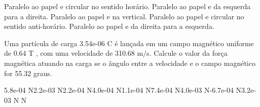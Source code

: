 \documentclass[12pt, addpoints]{exam}
\begin{document}
\begin{questions}
\begin{multicols*}{2}
\begin{choices}
\choice Paralelo ao papel e circular no sentido horário. 
\choice Paralelo ao papel e da esquerda para a direita. 
\choice Paralelo ao papel e na vertical. 
\choice Paralelo ao papel e circular no sentido anti-horário. 
\choice Paralelo ao papel e da direita para a esquerda. 
\end{choices}
\question Uma partícula de carga 3.54e-06 C é lançada em um campo magnético uniforme de    0.64 T , com uma velocidade de 310.68 m/s. Calcule o valor da força magnética atuando na carga se o ângulo entre a velocidade e o campo magnético for   55.32 graus.

\begin{oneparchoices}
\choice 5.8e-04 N\choice 2.2e-03 N\choice 2.2e-04 N\choice 4.0e-04 N\choice 1.1e-04 N\choice 7.4e-04 N\choice 4.0e-03 N\choice -6.7e-04 N\choice 3.2e-03 N N
\end{oneparchoices}\end{multicols*}
\end{questions}
\newpage
\end{document}
